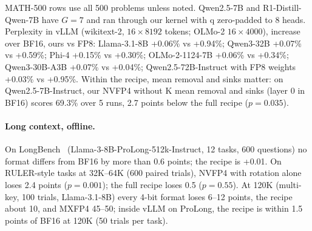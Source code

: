 \documentclass[11pt]{article}
\begin{document}
MATH-500 rows use all 500 problems unless noted. Qwen2.5-7B and R1-Distill-Qwen-7B have $G = 7$ and ran through our kernel with q zero-padded to 8 heads. Perplexity in vLLM (wikitext-2, $16 \times 8192$ tokens; OLMo-2 $16 \times 4000$), increase over BF16, ours vs FP8: Llama-3.1-8B +0.06\% vs +0.94\%; Qwen3-32B +0.07\% vs +0.59\%; Phi-4 +0.15\% vs +0.30\%; OLMo-2-1124-7B +0.06\% vs +0.34\%; Qwen3-30B-A3B +0.07\% vs +0.04\%; Qwen2.5-72B-Instruct with FP8 weights +0.03\% vs +0.95\%. Within the recipe, mean removal and sinks matter: on Qwen2.5-7B-Instruct, our NVFP4 without K mean removal and sinks (layer 0 in BF16) scores 69.3\% over 5 runs, 2.7 points below the full recipe ($p = 0.035$).

\paragraph{Long context, offline.} On LongBench~\cite{bai2024longbench} (Llama-3-8B-ProLong-512k-Instruct, 12 tasks, 600 questions) no format differs from BF16 by more than 0.6 points; the recipe is +0.01. On RULER-style tasks at 32K--64K (600 paired trials), NVFP4 with rotation alone loses 2.4 points ($p = 0.001$); the full recipe loses 0.5 ($p = 0.55$). At 120K (multi-key, 100 trials, Llama-3.1-8B) every 4-bit format loses 6--12 points, the recipe about 10, and MXFP4 45--50; inside vLLM on ProLong, the recipe is within 1.5 points of BF16 at 120K (50 trials per task).
\end{document}
